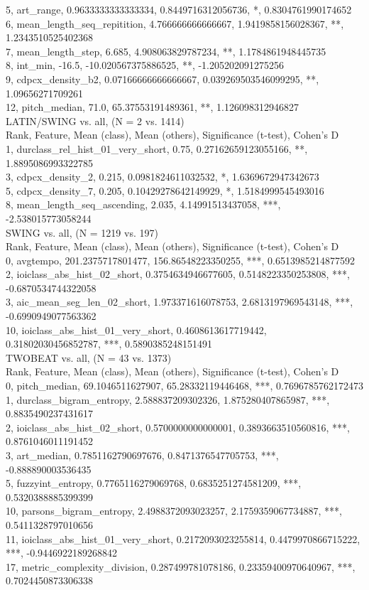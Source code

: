 5, art_range, 0.9633333333333334, 0.8449716312056736, *, 0.8304761990174652\\
6, mean_length_seq_repitition, 4.766666666666667, 1.9419858156028367, **, 1.2343510525402368\\
7, mean_length_step, 6.685, 4.908063829787234, **, 1.1784861948445735\\
8, int_min, -16.5, -10.020567375886525, **, -1.205202091275256\\
9, cdpcx_density_b2, 0.07166666666666667, 0.039269503546099295, **, 1.09656271709261\\
12, pitch_median, 71.0, 65.37553191489361, **, 1.126098312946827\\
LATIN/SWING vs. all, (N = 2 vs. 1414)\\
Rank, Feature, Mean (class), Mean (others), Significance (t-test), Cohen's D\\
1, durclass_rel_hist_01_very_short, 0.75, 0.27162659123055166, **, 1.8895086993322785\\
3, cdpcx_density_2, 0.215, 0.0981824611032532, *, 1.6369672947342673\\
5, cdpcx_density_7, 0.205, 0.10429278642149929, *, 1.5184999545493016\\
8, mean_length_seq_ascending, 2.035, 4.14991513437058, ***, -2.538015773058244\\
SWING vs. all, (N = 1219 vs. 197)\\
Rank, Feature, Mean (class), Mean (others), Significance (t-test), Cohen's D\\
0, avgtempo, 201.2375717801477, 156.86548223350255, ***, 0.6513985214877592\\
2, ioiclass_abs_hist_02_short, 0.3754634946677605, 0.5148223350253808, ***, -0.6870534744322058\\
3, aic_mean_seg_len_02_short, 1.973371616078753, 2.6813197969543148, ***, -0.6990949077563362\\
10, ioiclass_abs_hist_01_very_short, 0.4608613617719442, 0.31802030456852787, ***, 0.5890385248151491\\
TWOBEAT vs. all, (N = 43 vs. 1373)\\
Rank, Feature, Mean (class), Mean (others), Significance (t-test), Cohen's D\\
0, pitch_median, 69.1046511627907, 65.28332119446468, ***, 0.7696785762172473\\
1, durclass_bigram_entropy, 2.588837209302326, 1.875280407865987, ***, 0.8835490237431617\\
2, ioiclass_abs_hist_02_short, 0.5700000000000001, 0.3893663510560816, ***, 0.8761046011191452\\
3, art_median, 0.7851162790697676, 0.8471376547705753, ***, -0.888890003536435\\
5, fuzzyint_entropy, 0.7765116279069768, 0.6835251274581209, ***, 0.5320388885399399\\
10, parsons_bigram_entropy, 2.4988372093023257, 2.1759359067734887, ***, 0.5411328797010656\\
11, ioiclass_abs_hist_01_very_short, 0.2172093023255814, 0.4479970866715222, ***, -0.9446922189268842\\
17, metric_complexity_division, 0.287499781078186, 0.23359400970640967, ***, 0.7024450873306338\\
